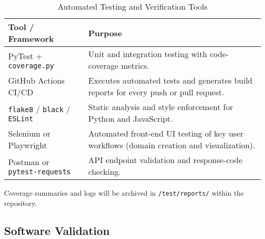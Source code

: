 \documentclass[12pt, titlepage]{article}
\renewcommand{\arraystretch}{1.15}
\begin{document}
\begin{table}[H]
\centering
\caption{Automated Testing and Verification Tools}
\setlength{\tabcolsep}{6pt}
\renewcommand{\arraystretch}{1.2}
\footnotesize

\begin{tabularx}{\textwidth}{l X}
\toprule
\textbf{Tool / Framework} & \textbf{Purpose} \\
\midrule
\arrayrulecolor[gray]{0.8}
PyTest + \texttt{coverage.py} &
Unit and integration testing with code-coverage metrics. \\
\hline
GitHub Actions CI/CD &
Executes automated tests and generates build reports for every push or pull
request. \\
\hline
\texttt{flake8} / \texttt{black} / \texttt{ESLint} &
Static analysis and style enforcement for Python and JavaScript. \\
\hline
Selenium or Playwright &
Automated front-end UI testing of key user workflows (domain creation and
visualization). \\
\hline
Postman or \texttt{pytest-requests} &
API endpoint validation and response-code checking. \\
\bottomrule
\end{tabularx}
\end{table}

Coverage summaries and logs will be archived in \texttt{/test/reports/} within
the repository.

\subsection{Software Validation}
\label{subsec:software-validation}




\end{document}
